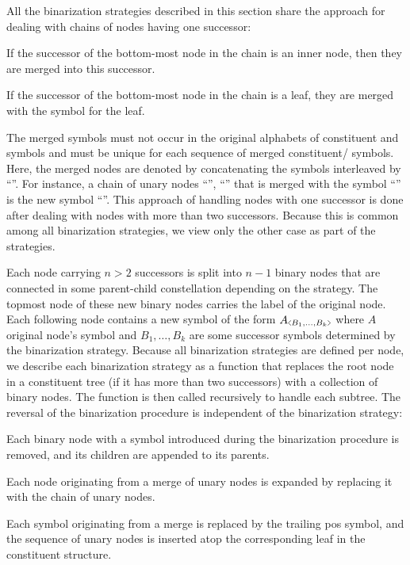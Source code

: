 \documentclass[../../document.tex]{subfiles}
\begin{document}
    All the binarization strategies described in this section share the approach for dealing with chains of nodes having one successor:
    \begin{inparaenum}
        \item If the successor of the bottom-most node in the chain is an inner node, then they are merged into this successor.
        \item If the successor of the bottom-most node in the chain is a leaf, they are merged with the  symbol for the leaf.
    \end{inparaenum}
    The merged symbols must not occur in the original alphabets of constituent and  symbols and must be unique for each sequence of merged constituent/ symbols.
    Here, the merged nodes are denoted by concatenating the symbols interleaved by ``\cn{+}''.
    For instance, a chain of unary nodes ``'', ``'' that is merged with the  symbol ``'' is the new symbol ``''.
    This approach of handling nodes with one successor is done after dealing with nodes with more than two successors.
    Because this is common among all binarization strategies, we view only the other case as part of the strategies.

    Each node carrying \( n > 2 \) successors is split into \( n-1 \) binary nodes that are connected in some parent-child constellation depending on the strategy.
    The topmost node of these new binary nodes carries the label of the original node.
    Each following node contains a new symbol of the form \(A\binsym{B_1, \ldots, B_k}\) where \(A\) original node's symbol and \(B_1, \ldots, B_k\) are some successor symbols determined by the binarization strategy.
    Because all binarization strategies are defined per node, we describe each binarization strategy as a function that replaces the root node in a constituent tree (if it has more than two successors) with a collection of binary nodes.
    The function is then called recursively to handle each subtree.
    The reversal of the binarization procedure is independent of the binarization strategy:
    \begin{compactenum}
        \item Each binary node with a symbol introduced during the binarization procedure is removed, and its children are appended to its parents.
        \item Each node originating from a merge of unary nodes is expanded by replacing it with the chain of unary nodes.
        \item Each  symbol originating from a merge is replaced by the trailing pos symbol, and the sequence of unary nodes is inserted atop the corresponding leaf in the constituent structure.
    \end{compactenum}
\end{document}
